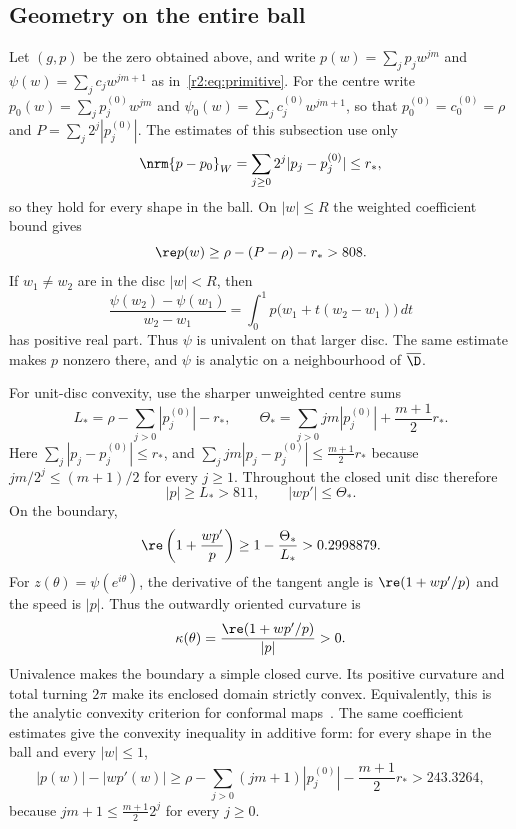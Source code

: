 \subsection{Geometry on the entire ball}
Let $(g,p)$ be the zero obtained above, and write $p(w)=\sum_jp_jw^{jm}$ and $\psi(w)=\sum_jc_jw^{jm+1}$ as in~\eqref{r2:eq:primitive}. For the centre write $p_0(w)=\sum_jp^{(0)}_jw^{jm}$ and $\psi_0(w)=\sum_jc^{(0)}_jw^{jm+1}$, so that $p^{(0)}_0=c^{(0)}_0=\rho$ and $P=\sum_j2^j|p^{(0)}_j|$. The estimates of this subsection use only
\[
 \nrm{p-p_0}_W=\sum_{j\ge0}2^j|p_j-p^{(0)}_j|\le r_*,
\]
so they hold for every shape in the ball. On $|w|\le R$ the weighted coefficient bound gives
\begin{equation}\label{r2:eq:univalence-ball}
 \re p(w)\ge\rho-(P-\rho)-r_*>808.
\end{equation}
If $w_1\ne w_2$ are in the disc $|w|<R$, then
\[
 \frac{\psi(w_2)-\psi(w_1)}{w_2-w_1}
 =\int_0^1p\bigl(w_1+t(w_2-w_1)\bigr)\,dt
\]
has positive real part. Thus $\psi$ is univalent on that larger disc. The same estimate makes $p$ nonzero there, and $\psi$ is analytic on a neighbourhood of $\overline\D$.

For unit-disc convexity, use the sharper unweighted centre sums
\begin{equation}\label{r2:eq:geometry-LU}
 L_* =\rho-\sum_{j>0}|p^{(0)}_j|-r_*,
 \qquad\Theta_*=\sum_{j>0}jm|p^{(0)}_j|+\frac{m+1}{2}r_*.
\end{equation}
Here $\sum_j|p_j-p^{(0)}_j|\le r_*$, and $\sum_jjm|p_j-p^{(0)}_j|\le\frac{m+1}2r_*$ because $jm/2^j\le(m+1)/2$ for every $j\ge1$. Throughout the closed unit disc therefore
\[
 |p|\ge L_*>811,
 \qquad |wp'|\le\Theta_*.
\]
On the boundary,
\begin{equation}\label{r2:eq:convexity-ball}
 \re\left(1+\frac{wp'}p\right)
 \ge1-\frac{\Theta_*}{L_*}>0.2998879.
\end{equation}
For $z(\theta)=\psi(e^{i\theta})$, the derivative of the tangent angle is $\re(1+wp'/p)$ and the speed is $|p|$. Thus the outwardly oriented curvature is
\begin{equation}\label{r2:eq:curvature-formula}
 \kappa(\theta)=\frac{\re(1+wp'/p)}{|p|}>0.
\end{equation}
Univalence makes the boundary a simple closed curve. Its positive curvature and total turning $2\pi$ make its enclosed domain strictly convex. Equivalently, this is the analytic convexity criterion for conformal maps~\cite[\S2.5]{Dur83}. The same coefficient estimates give the convexity inequality in additive form: for every shape in the ball and every $|w|\le1$,
\begin{equation}\label{r2:eq:joint-margin}
 |p(w)|-|wp'(w)|\ge
 \rho-\sum_{j>0}(jm+1)|p^{(0)}_j|-\frac{m+1}{2}r_*>243.3264,
\end{equation}
because $jm+1\le\frac{m+1}22^j$ for every $j\ge0$.

